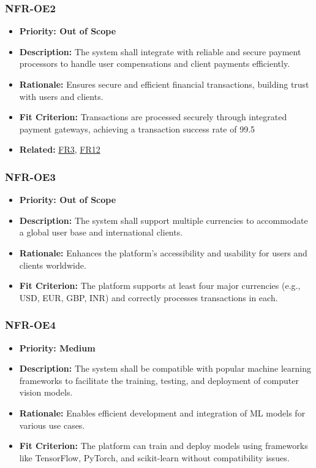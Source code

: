 \documentclass[12pt]{article}
\begin{document}
\subsubsection*{NFR-OE2}
\label{sec:OE2}
\begin{itemize}
  \item \textbf{Priority: Out of Scope}
  \item \textbf{Description:} The system shall integrate with reliable and secure payment processors to handle user compensations and client payments efficiently.
  \item \textbf{Rationale:} Ensures secure and efficient financial transactions, building trust with users and clients.
  \item \textbf{Fit Criterion:} Transactions are processed securely through integrated payment gateways, achieving a transaction success rate of 99.5%
  \item \textbf{Related:} \hyperref[sec:FR3]{FR3}, \hyperref[sec:FR12]{FR12}
\end{itemize}
\subsubsection*{NFR-OE3}
\label{sec:OE3}
\begin{itemize}
  \item \textbf{Priority: Out of Scope}
  \item \textbf{Description:} The system shall support multiple currencies to accommodate a global user base and international clients.
  \item \textbf{Rationale:} Enhances the platform’s accessibility and usability for users and clients worldwide.
  \item \textbf{Fit Criterion:} The platform supports at least four major currencies (e.g., USD, EUR, GBP, INR) and correctly processes transactions in each.
\end{itemize}
\subsubsection*{NFR-OE4}
\label{sec:OE4}
\begin{itemize}
  \item \textbf{Priority: Medium}
  \item \textbf{Description:} The system shall be compatible with popular machine learning frameworks to facilitate the training, testing, and deployment of computer vision models.
  \item \textbf{Rationale:} Enables efficient development and integration of ML models for various use cases.
  \item \textbf{Fit Criterion:} The platform can train and deploy models using frameworks like TensorFlow, PyTorch, and scikit-learn without compatibility issues.
\end{itemize}
\end{document}
